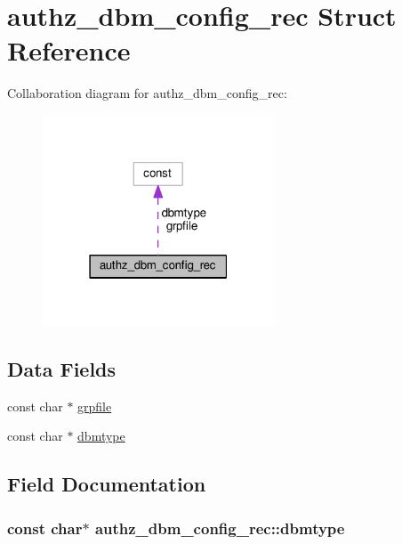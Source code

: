\hypertarget{structauthz__dbm__config__rec}{}\section{authz\+\_\+dbm\+\_\+config\+\_\+rec Struct Reference}
\label{structauthz__dbm__config__rec}


Collaboration diagram for authz\+\_\+dbm\+\_\+config\+\_\+rec\+:
\nopagebreak
\begin{figure}[H]
\begin{center}
\leavevmode
\includegraphics[width=195pt]{structauthz__dbm__config__rec__coll__graph}
\end{center}
\end{figure}
\subsection*{Data Fields}
\begin{DoxyCompactItemize}
\item 
const char $\ast$ \hyperlink{structauthz__dbm__config__rec_acba7c479b44e2b0bf31e913de4675cfb}{grpfile}
\item 
const char $\ast$ \hyperlink{structauthz__dbm__config__rec_a173a7ef6befedaddf581b3a176df872b}{dbmtype}
\end{DoxyCompactItemize}


\subsection{Field Documentation}
\subsubsection[{\texorpdfstring{dbmtype}{dbmtype}}]{\setlength{\rightskip}{0pt plus 5cm}const char$\ast$ authz\+\_\+dbm\+\_\+config\+\_\+rec\+::dbmtype}\hypertarget{structauthz__dbm__config__rec_a173a7ef6befedaddf581b3a176df872b}{}\label{structauthz__dbm__config__rec_a173a7ef6befedaddf581b3a176df872b}
